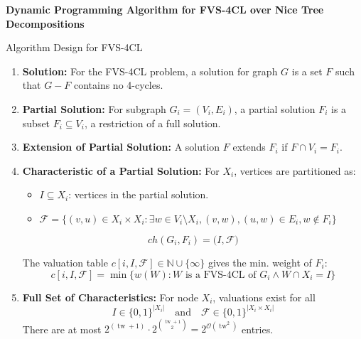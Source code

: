\documentclass{beamer}
\newcommand{\tw}{\operatorname{tw}}
\begin{document}
\begin{frame}
  \centering
  \vfill
  \LARGE \textbf{Dynamic Programming Algorithm for FVS-4CL over Nice Tree Decompositions}
  \vfill
\end{frame}

\begin{frame}{Algorithm Design for FVS-4CL}
  \label{alg:dp}
\footnotesize
\begin{enumerate}
    \item \textbf{Solution:} For the FVS-4CL problem, a solution for graph \(G\) is a set \(F\) such that \(G - F\) contains no 4-cycles.

    \item \textbf{Partial Solution:} For subgraph \(G_i = (V_i, E_i)\), a partial solution \(F_i\) is a subset \(F_i \subseteq V_i\), a restriction of a full solution.

    \item \textbf{Extension of Partial Solution:} A solution \(F\) extends \(F_i\) if \(F \cap V_i = F_i\).

    \item \textbf{Characteristic of a Partial Solution:} For \(X_i\), vertices are partitioned as:
    \begin{itemize}
        \item \(I \subseteq X_i\): vertices in the partial solution.
        \item $\mathcal{F} = \{(v,u) \in X_i \times X_i : \exists w \in V_i \setminus X_i, (v,w), (u,w) \in E_i, w \notin F_i \}$
        
    \end{itemize}
    \[
    ch(G_i, F_i) = \big(I, \mathcal{F}\big)
    \]

    The valuation table \(c[i, I, \mathcal{F}] \in \mathbb{N} \cup \{\infty\}\) gives the min. weight of \(F_i\):
    \[
    c[i, I, \mathcal{F}] = \min \{ w(W) : W \text{ is a FVS-4CL of } G_i \land W \cap X_i = I \}
    \]

    \item \textbf{Full Set of Characteristics:} For node \(X_i\), valuations exist for all
    \[
    I \in \{0,1\}^{|X_i|} \quad \text{and} \quad \mathcal{F} \in \{0,1\}^{|X_i \times X_i|}
    \]
    There are at most \(2^{(\tw+1)} \cdot 2^{\binom{\tw+1}{2}} = 2^{\mathcal{O}(\tw^2)}\) entries.
\end{enumerate}

\end{frame}
\end{document}
